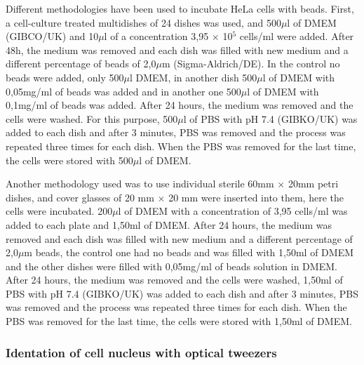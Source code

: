 \documentclass[12pt, a4paper]{article} %
\begin{document}
\setlength{\parskip}{4mm}

Different methodologies have been used to incubate HeLa cells with beads. First, a cell-culture treated multidishes of 24 dishes was used, and 500$\mu$l of DMEM (GIBCO/UK) and 10$\mu$l of a concentration 3,95 $\times$ 10$^{5}$ cells/ml were added. After 48h, the medium was removed and each dish was filled with new medium and a different percentage of beads of 2,0$\mu$m (Sigma-Aldrich/DE). In the control no beads were added, only 500$\mu$l DMEM, in another dish 500$\mu$l of DMEM with 0,05mg/ml of beads was added and in another one 500$\mu$l of DMEM with 0,1mg/ml of beads was added. After 24 hours, the medium was removed and the cells were washed. For this purpose, 500$\mu$l of PBS with pH 7.4 (GIBKO/UK) was added to each dish and after 3 minutes, PBS was removed and the process was repeated three times for each dish. When the PBS was removed for the last time, the cells were stored with 500$\mu$l of DMEM.

Another methodology used was to use individual sterile 60mm $\times$ 20mm petri dishes, and cover glasses of 20 mm $\times$ 20 mm were inserted into them, here the cells were incubated. 200$\mu$l of DMEM with a concentration of 3,95 cells/ml was added to each plate and 1,50ml of DMEM. After 24 hours, the medium was removed and each dish was filled with new medium and a different percentage of 2,0$\mu$m beads, the control one had no beads and was filled with 1,50ml of DMEM and the other dishes were filled with 0,05mg/ml of beads solution in DMEM. After 24 hours, the medium was removed and the cells were washed, 1,50ml of PBS with pH 7.4 (GIBKO/UK) was added to each dish and after 3 minutes, PBS was removed and the process was repeated three times for each dish. When the PBS was removed for the last time, the cells were stored with 1,50ml of DMEM. 

\setlength{\parskip}{0mm}

\subsubsection{Identation of cell nucleus with optical tweezers}
\end{document}
